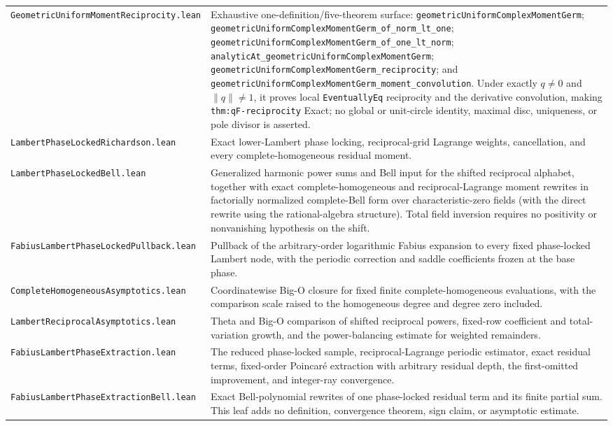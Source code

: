 \documentclass[11pt,oneside]{article}
\theoremstyle{definition}
\theoremstyle{remark}
\begin{document}
\begin{longtable}{>{\raggedright\arraybackslash}p{} >{\raggedright\arraybackslash}p{}}
\nolinkurl{GeometricUniformMomentReciprocity.lean} & Exhaustive one-definition/five-theorem surface: \nolinkurl{geometricUniformComplexMomentGerm}; \nolinkurl{geometricUniformComplexMomentGerm_of_norm_lt_one}; \nolinkurl{geometricUniformComplexMomentGerm_of_one_lt_norm}; \nolinkurl{analyticAt_geometricUniformComplexMomentGerm}; \nolinkurl{geometricUniformComplexMomentGerm_reciprocity}; and \nolinkurl{geometricUniformComplexMomentGerm_moment_convolution}.  Under exactly \(q\ne0\) and \(\lVert q\rVert\ne1\), it proves local \nolinkurl{EventuallyEq} reciprocity and the derivative convolution, making \nolinkurl{thm:qF-reciprocity} Exact; no global or unit-circle identity, maximal disc, uniqueness, or pole divisor is asserted. \\
\nolinkurl{LambertPhaseLockedRichardson.lean} & Exact lower-Lambert phase locking, reciprocal-grid Lagrange weights, cancellation, and every complete-homogeneous residual moment. \\
\nolinkurl{LambertPhaseLockedBell.lean} & Generalized harmonic power sums and Bell input for the shifted reciprocal alphabet, together with exact complete-homogeneous and reciprocal-Lagrange moment rewrites in factorially normalized complete-Bell form over characteristic-zero fields (with the direct rewrite using the rational-algebra structure).  Total field inversion requires no positivity or nonvanishing hypothesis on the shift. \\
\nolinkurl{FabiusLambertPhaseLockedPullback.lean} & Pullback of the arbitrary-order logarithmic Fabius expansion to every fixed phase-locked Lambert node, with the periodic correction and saddle coefficients frozen at the base phase. \\
\nolinkurl{CompleteHomogeneousAsymptotics.lean} & Coordinatewise Big-O closure for fixed finite complete-homogeneous evaluations, with the comparison scale raised to the homogeneous degree and degree zero included. \\
\nolinkurl{LambertReciprocalAsymptotics.lean} & Theta and Big-O comparison of shifted reciprocal powers, fixed-row coefficient and total-variation growth, and the power-balancing estimate for weighted remainders. \\
\nolinkurl{FabiusLambertPhaseExtraction.lean} & The reduced phase-locked sample, reciprocal-Lagrange periodic estimator, exact residual terms, fixed-order Poincaré extraction with arbitrary residual depth, the first-omitted improvement, and integer-ray convergence. \\
\nolinkurl{FabiusLambertPhaseExtractionBell.lean} & Exact Bell-polynomial rewrites of one phase-locked residual term and its finite partial sum.  This leaf adds no definition, convergence theorem, sign claim, or asymptotic estimate. \\

\end{longtable}
\end{document}
